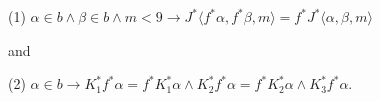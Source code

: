(1) $\alpha \in b \wedge \beta \in b \wedge m < 9 \rightarrow J^*\langle f^*\alpha, f^*\beta, m \rangle = f^*J^*\langle \alpha, \beta, m \rangle$

and

(2) $\alpha \in b \rightarrow K_1^*f^*\alpha = f^*K_1^*\alpha \wedge K_2^*f^*\alpha = f^*K_2^*\alpha \wedge K_3^*f^*\alpha$.
